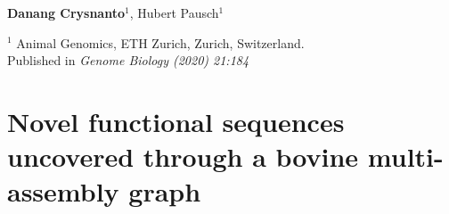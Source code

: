 \documentclass[11 pt, a4paper, notitlepage, twoside]{report}
\begin{document}
\subsection*{}
\normalsize

{
\vspace{2em}
\setlength\parindent{0pt}
\large

\textbf{Danang Crysnanto}$^{1}$, Hubert Pausch$^{1}$ \\

\vspace{0.5em}

$^1$ Animal Genomics, ETH Zurich, Zurich, Switzerland. \\

\bigskip
Published in \emph{Genome Biology (2020) 21:184}

\bigskip

\begin{center}\end{center}

}



\iftwoside
\cleardoublepage
\newpage
\fi

\chapter[A Pangenome Established From Six Assemblies]{\LARGE{Novel functional sequences uncovered through a bovine multi-assembly graph}}
\label{chap:multigraph}

\subsection*{}
\normalsize
\end{document}
